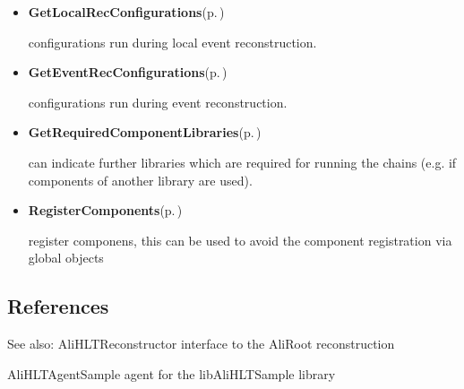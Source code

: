 \begin{itemize}
\item {\bf Get\-Local\-Rec\-Configurations}{\rm (p.\,\pageref{classAliHLTModuleAgent_a5})} \par
 configurations run during local event reconstruction. 
\item {\bf Get\-Event\-Rec\-Configurations}{\rm (p.\,\pageref{classAliHLTModuleAgent_a6})} \par
 configurations run during event reconstruction. 
\item {\bf Get\-Required\-Component\-Libraries}{\rm (p.\,\pageref{classAliHLTModuleAgent_a7})} \par
 can indicate further libraries which are required for running the chains (e.g. if components of another library are used).\end{itemize}


\begin{itemize}
\item {\bf Register\-Components}{\rm (p.\,\pageref{classAliHLTModuleAgent_a8})} \par
 register componens, this can be used to avoid the component registration via global objects 
\end{itemize}
\subsection{References}\label{classAliHLTModuleAgent_alihltmoduleagent_references}
\begin{Desc}
\item[See also:]Ali\-HLTReconstructor interface to the Ali\-Root reconstruction 

Ali\-HLTAgent\-Sample agent for the lib\-Ali\-HLTSample library \end{Desc}




